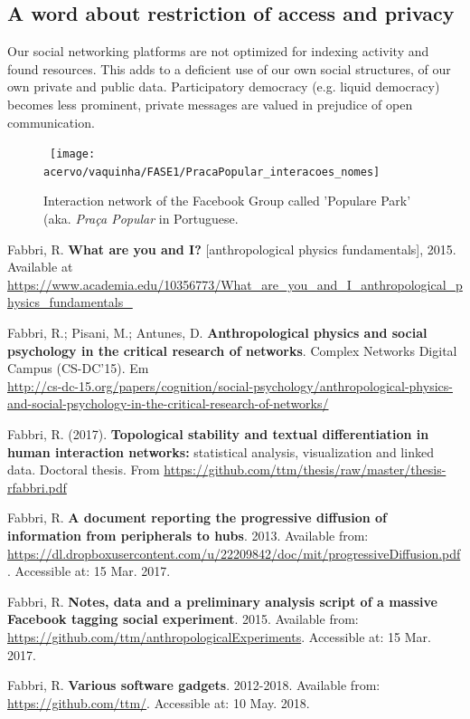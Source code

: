 \documentclass[a4paper]{article}
\begin{document}
\subsection{A word about restriction of access and privacy}
Our social networking platforms are not optimized for indexing activity
and found resources.
This adds to a deficient use of our own social structures,
of our own private and public data.
Participatory democracy (e.g. liquid democracy) becomes less prominent,
private messages are valued in prejudice of open communication.

\begin{figure}[!h]
  \centering
    \hbox{\hspace{1.5em} \texttt{[image: acervo/vaquinha/FASE1/PracaPopular\_interacoes\_nomes]}}
  \caption{Interaction network of the Facebook Group called 'Populare Park' (aka. \emph{Praça Popular} in Portuguese.}
\end{figure}

\begin{thebibliography}{9}
	Fabbri, R. \textbf{What are you and I?} [anthropological physics fundamentals], 2015. Available at \url{https://www.academia.edu/10356773/What\_are\_you\_and\_I\_anthropological\_physics\_fundamentals\_}

	Fabbri, R.; Pisani, M.; Antunes, D. \textbf{Anthropological physics and social psychology in the critical research of networks}. Complex Networks Digital Campus (CS-DC'15).
	Em \\\url{http://cs-dc-15.org/papers/cognition/social-psychology/anthropological-physics-and-social-psychology-in-the-critical-research-of-networks/}

Fabbri, R. (2017). \textbf{Topological stability and textual differentiation in human interaction networks:}
		statistical analysis, visualization and linked data. Doctoral thesis.
		From \url{https://github.com/ttm/thesis/raw/master/thesis-rfabbri.pdf}

	Fabbri, R. \textbf{A document reporting the progressive diffusion of information from peripherals to hubs}. 2013. Available from: \url{https://dl.dropboxusercontent.com/u/22209842/doc/mit/progressiveDiffusion.pdf}. Accessible at: 15 Mar. 2017.

	Fabbri, R. \textbf{Notes, data and a preliminary analysis script of a massive Facebook tagging social experiment}. 2015. Available from: \url{https://github.com/ttm/anthropologicalExperiments}. Accessible at: 15 Mar. 2017.

	Fabbri, R. \textbf{Various software gadgets}. 2012-2018. Available from: \url{https://github.com/ttm/}. Accessible at: 10 May. 2018.

\end{thebibliography}
\end{document}
